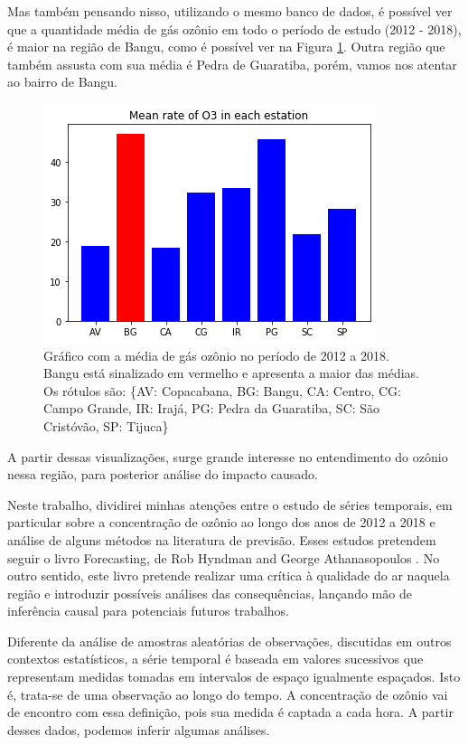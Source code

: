 Mas também pensando nisso, utilizando o mesmo banco de dados, é possível ver
que a quantidade média de gás ozônio em todo o período de estudo (2012 -
2018), é maior na região de Bangu, como é possível ver na Figura
\ref{fig:graph2}. Outra região que também assusta com sua média é Pedra de
Guaratiba, porém, vamos nos atentar ao bairro de Bangu. 

\begin{figure}
    \includegraphics[width=\linewidth]{img/graphic2.png}
    \caption{Gráfico com a média de gás ozônio no período de 2012 a 2018.
    Bangu está sinalizado em vermelho e apresenta a maior das médias. Os
    rótulos são: \{AV: Copacabana, BG: Bangu, CA: Centro, CG: Campo Grande,
    IR: Irajá, PG: Pedra da Guaratiba, SC: São Cristóvão, SP: Tijuca\}}
    \label{fig:graph2}
\end{figure}

A partir dessas visualizações, surge grande interesse no entendimento do
ozônio nessa região, para posterior análise do impacto causado. 

Neste trabalho, dividirei minhas atenções entre o estudo de séries temporais,
em particular sobre a concentração de ozônio ao longo dos anos de 2012 a 2018
e análise de alguns métodos na literatura de previsão. Esses estudos pretendem
seguir o livro Forecasting, de Rob Hyndman and George Athanasopoulos
\cite{forecasting}. No outro sentido, este livro pretende realizar uma crítica
à qualidade do ar naquela região e introduzir possíveis análises das
consequências, lançando mão de inferência causal para potenciais futuros
trabalhos. 

Diferente da análise de amostras aleatórias de observações, discutidas em
outros contextos estatísticos, a série temporal é baseada em valores
sucessivos que representam medidas tomadas em intervalos de espaço igualmente
espaçados. Isto é, trata-se de uma observação ao longo do tempo. A
concentração de ozônio vai de encontro com essa definição, pois sua medida é
captada a cada hora. A partir desses dados, podemos inferir algumas análises. 

